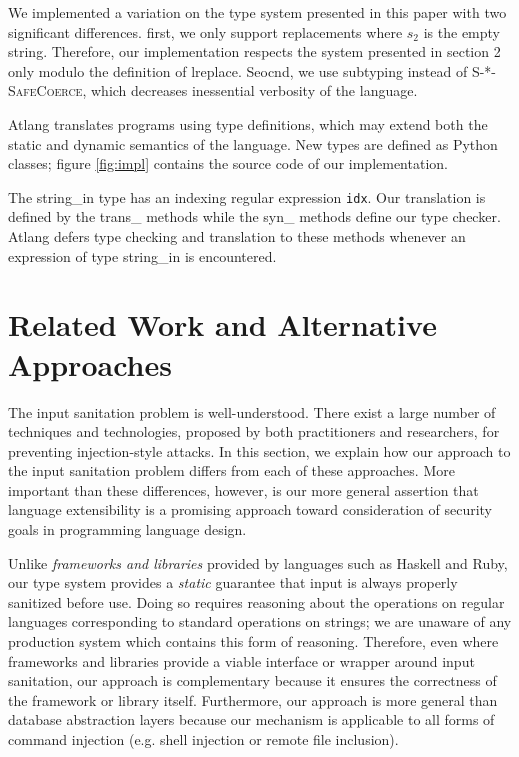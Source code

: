 \documentclass[9pt]{sig-alternate}
\theoremstyle{definition}
\begin{document}
We implemented a variation on the type system presented in this paper with two
significant differences. first, we only support replacements where $s_2$ is the empty
string. Therefore, our implementation respects the system presented in section 2
only modulo the definition of \textsf{lreplace}. Seocnd, we use subtyping instead of
\textsc{S-*-SafeCoerce}, which decreases inessential verbosity of the language.

Atlang translates programs using type definitions, which may extend both the
static and dynamic semantics of the language. New types are defined as Python
classes; figure \ref{fig:impl} contains the source code of our implementation.

The \textsf{string_in} type has an indexing regular expression \texttt{idx}.
Our translation is defined by the \textsf{trans_} methods while the \textsf{syn_}
methods define our type checker. Atlang defers type checking and translation
to these methods whenever an expression of type \textsf{string_in} is encountered.


\section{Related Work and Alternative Approaches}\label{related}



The input sanitation problem is well-understood. There exist a large number of techniques and technologies, proposed by both practitioners and researchers, for preventing injection-style attacks. In this section, we explain how our approach to the input sanitation problem differs from each of these approaches. More important than these differences, however, is our more general assertion that language extensibility is a promising approach toward consideration of security goals in programming language design.

Unlike \emph{frameworks and libraries} provided by languages such as Haskell and Ruby, our type system provides a \emph{static} guarantee that input is always properly sanitized before use. Doing so requires reasoning about the operations on regular languages corresponding to standard operations on strings; we are unaware of any production system which contains this form of reasoning. Therefore, even where frameworks and libraries provide a viable interface or wrapper around input sanitation, our approach is complementary because it ensures the correctness of the framework or library itself. Furthermore, our approach is more general than database abstraction layers because our mechanism is applicable to all forms of command injection (e.g. shell injection or remote file inclusion).
\end{document}
